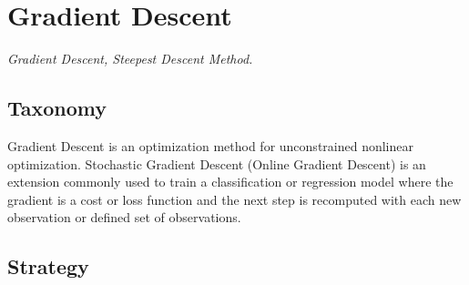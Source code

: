 
\section{Gradient Descent} 
\label{sec:gradient_descent}

\emph{Gradient Descent, Steepest Descent Method.}

\subsection{Taxonomy}
Gradient Descent is an optimization method for unconstrained nonlinear optimization.
Stochastic Gradient Descent (Online Gradient Descent) is an extension commonly used to train a classification or regression model where the gradient is a cost or loss function and the next step is recomputed with each new observation or defined set of observations.

\subsection{Strategy}


